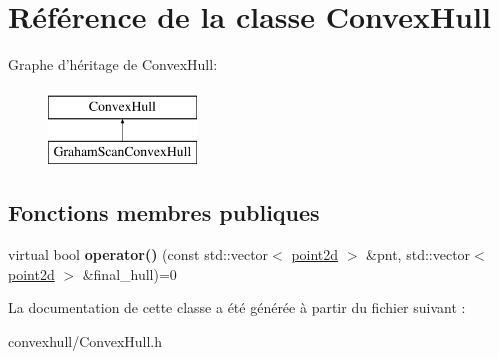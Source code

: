 \hypertarget{class_convex_hull}{\section{Référence de la classe Convex\-Hull}
\label{class_convex_hull}
}
Graphe d'héritage de Convex\-Hull\-:\begin{figure}[H]
\begin{center}
\leavevmode
\includegraphics[height=2.000000cm]{class_convex_hull}
\end{center}
\end{figure}
\subsection*{Fonctions membres publiques}
\begin{DoxyCompactItemize}
\item 
\hypertarget{class_convex_hull_a21faf0ac7d97b87887afb40eb162ec65}{virtual bool {\bfseries operator()} (const std\-::vector$<$ \hyperlink{structpoint2d}{point2d} $>$ \&pnt, std\-::vector$<$ \hyperlink{structpoint2d}{point2d} $>$ \&final\-\_\-hull)=0}\label{class_convex_hull_a21faf0ac7d97b87887afb40eb162ec65}

\end{DoxyCompactItemize}


La documentation de cette classe a été générée à partir du fichier suivant \-:\begin{DoxyCompactItemize}
\item 
convexhull/Convex\-Hull.\-h\end{DoxyCompactItemize}
